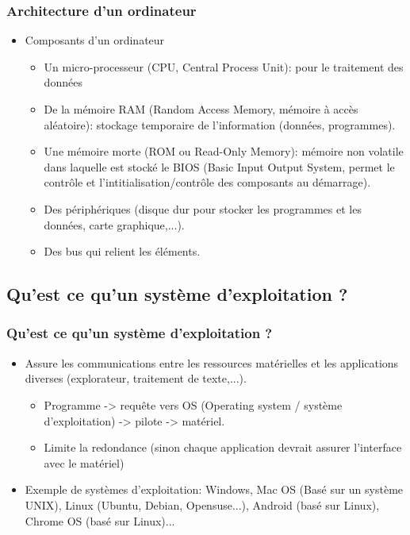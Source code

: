 \documentclass[10pt, xcolor=dvipsnames]{beamer}
\begin{document}
\frame
{
\frametitle{Architecture d'un ordinateur}

  \begin{itemize}
  \item Composants d'un ordinateur
    \begin{itemize}
      \item Un micro-processeur (CPU, Central Process Unit): pour le traitement des données
      \item De la mémoire RAM (Random Access Memory, mémoire à accès aléatoire): stockage temporaire de l'information (données, programmes).
      \item Une mémoire morte (ROM ou Read-Only Memory): mémoire non volatile dans laquelle est stocké le BIOS (Basic Input Output System, permet le contrôle et l'intitialisation/contrôle des composants au démarrage).
      \item Des périphériques (disque dur pour stocker les programmes et les données, carte graphique,...).
      \item Des bus qui relient les éléments.
      \end{itemize}

  \end{itemize}
}


\subsection{Qu'est ce qu'un système d'exploitation ?}

\frame
{
\frametitle{Qu'est ce qu'un système d'exploitation ?}


  \begin{itemize}
  \item Assure les communications entre les ressources matérielles et les applications diverses (explorateur, traitement de texte,...).
         \begin{itemize}
            \item Programme -> requête vers OS (Operating system / système d'exploitation) -> pilote -> matériel.
            \item Limite la redondance (sinon chaque application devrait assurer l'interface avec le matériel)
         \end{itemize}
  \item Exemple de systèmes d'exploitation: Windows, Mac OS (Basé sur un système UNIX), Linux (Ubuntu, Debian, Opensuse...), Android (basé sur Linux), Chrome OS (basé sur Linux)...

  \end{itemize}
}
\end{document}

